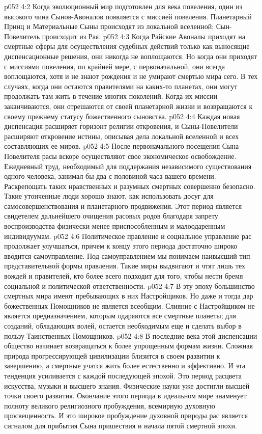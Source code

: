 \vs p052 4:2 \pc Когда эволюционный мир подготовлен для века повеления, один из высокого чина Сынов\hyp{}Авоналов появляется с миссией повеления. Планетарный Принц и Материальные Сыны происходят из локальной вселенной; Сын\hyp{}Повелитель происходит из Рая.
\vs p052 4:3 Когда Райские Авоналы приходят на смертные сферы для осуществления судебных действий только как выносящие диспенсационные решения, они никогда не воплощаются. Но когда они приходят с миссиями повеления, по крайней мере, с первоначальной, они всегда воплощаются, хотя и не знают рождения и не умирают смертью мира сего. В тех случаях, когда они остаются правителями на каких\hyp{}то планетах, они могут продолжать там жить в течение многих поколений. Когда их миссии заканчиваются, они отрешаются от своей планетарной жизни и возвращаются к своему прежнему статусу божественного сыновства.
\vs p052 4:4 Каждая новая диспенсация расширяет горизонт религии откровения, и Сыны\hyp{}Повелители расширяют откровение истины, описывая дела локальной вселенной и всех составляющих ее миров.
\vs p052 4:5 \pc После первоначального посещения Сына\hyp{}Повелителя расы вскоре осуществляют свое экономическое освобождение. Ежедневный труд, необходимый для поддержания независимого существования одного человека, занимал бы два с половиной часа вашего времени. Раскрепощать таких нравственных и разумных смертных совершенно безопасно. Такие утонченные люди хорошо знают, как использовать досуг для самосовершенствования и планетарного продвижения. Этот период является свидетелем дальнейшего очищения расовых родов благодаря запрету воспроизводства физически менее приспособленным и малоодаренным индивидуумам.
\vs p052 4:6 Политическое правление и социальное управление рас продолжает улучшаться, причем к концу этого периода достаточно широко вводится самоуправление. Под самоуправлением мы понимаем наивысший тип представительной формы правления. Такие миры выдвигают и чтят лишь тех вождей и правителей, кто более всего подходит для того, чтобы нести бремя социальной и политической ответственности.
\vs p052 4:7 В эту эпоху большинство смертных мира имеют пребывающих в них Настройщиков. Но даже и тогда дар божественных Помощников не является всеобщим. Слияние с Настройщиком не является предназначением, которым одаряются все смертные планеты; для созданий, обладающих волей, остается необходимым еще и сделать выбор в пользу Таинственных Помощников.
\vs p052 4:8 В последние века этой диспенсации общество начинает возвращаться к более упрощенным формам жизни. Сложная природа прогрессирующей цивилизации близится в своем развитии к завершению, а смертные учатся жить более естественно и эффективно. И эта тенденция усиливается с каждой последующей эпохой. Это период расцвета искусства, музыки и высшего знания. Физические науки уже достигли высшей точки своего развития. Окончание этого периода в идеальном мире знаменует полноту великого религиозного пробуждения, всемирную духовную просвещенность. И это широкое пробуждение духовной природы рас является сигналом для прибытия Сына пришествия и начала пятой смертной эпохи.

